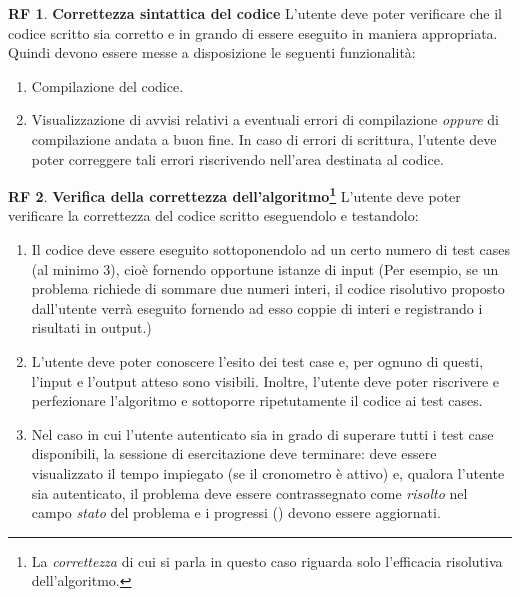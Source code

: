 \documentclass[11pt, a4paper]{article}
\theoremstyle{definition}
\newtheorem{funcreq}{RF} %
\begin{document}
\begin{funcreq}
\label{sintax}
\textbf{Correttezza sintattica del codice }
L'utente deve poter verificare che il codice scritto sia corretto e in grando di essere eseguito in maniera appropriata.
Quindi devono essere messe a disposizione le seguenti funzionalità:
\begin{enumerate}
    \item Compilazione del codice.
    \item Visualizzazione di avvisi relativi a eventuali errori di compilazione
    \textit{oppure} di compilazione andata a buon fine. In caso di errori
    di scrittura, l'utente deve poter correggere tali errori riscrivendo
    nell'area destinata al codice.
\end{enumerate}
\end{funcreq}

\begin{funcreq}
\label{test}
\textbf{Verifica della correttezza dell'algoritmo\footnote{La \textit{correttezza} di cui si parla in questo caso riguarda solo l'efficacia risolutiva dell'algoritmo.} }
L'utente deve poter verificare la correttezza del codice scritto eseguendolo
e testandolo:
\begin{enumerate}
    \item Il codice deve essere eseguito sottoponendolo ad un certo numero
    di test cases (al minimo 3),
    cioè fornendo opportune istanze di input (Per esempio,
    se un problema richiede di sommare due numeri interi, il codice risolutivo
    proposto dall'utente verrà eseguito fornendo ad esso coppie di interi
    e registrando i risultati in output.)

    \item L'utente deve poter conoscere l'esito dei test case e, per ognuno
    di questi, l'input e l'output atteso sono visibili.
    Inoltre, l'utente deve poter riscrivere e perfezionare l'algoritmo e
    sottoporre ripetutamente il codice ai test cases.

    \item Nel caso in cui l'utente autenticato sia in grado di superare tutti i
    test case disponibili, la sessione di esercitazione deve terminare: deve
    essere visualizzato il tempo impiegato (se il cronometro è attivo) e, qualora
    l'utente sia autenticato, il problema deve essere contrassegnato come
    \textit{risolto} nel campo \textit{stato} del problema e i progressi (\textcolor{blue}{}) devono
    essere aggiornati.
\end{enumerate}
\end{funcreq}
\end{document}
